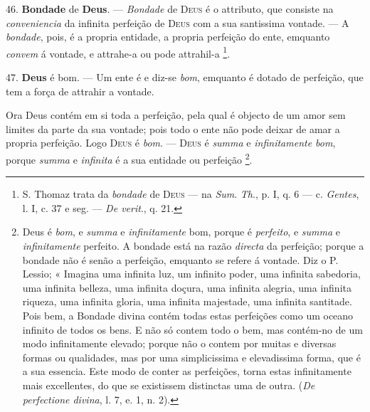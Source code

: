 46. \textbf{Bondade} de \textbf{Deus}. --- \emph{Bondade} de \textsc{Deus} é o attributo, que consiste na \emph{conveniencia} da infinita perfeição de \textsc{Deus} com a sua santissima vontade. --- A \emph{bondade}, pois, é a propria entidade, a propria perfeição do ente, emquanto \emph{convem} á vontade, e attrahe-a ou pode attrahil-a \footnote{S. Thomaz trata da \emph{bondade} de \textsc{Deus} --- na \emph{Sum}. \emph{Th}., p. I, q. 6 --- c. \emph{Gentes}, l. I, c. 37 e seg. --- \emph{De verit}., q. 21.}.

47. \textbf{Deus} é bom. --- Um ente é e diz-se \emph{bom}, emquanto é dotado de perfeição, que tem a força de attrahir a vontade.

 Ora Deus contém em si toda a perfeição, pela qual é objecto de um amor sem limites da parte da sua vontade; pois todo o ente não pode deixar de amar a propria perfeição. Logo \textsc{Deus} é \emph{bom}. --- \textsc{Deus} é \emph{summa} e \emph{infinitamente bom}, porque \emph{summa} e \emph{infinita} é a sua entidade ou perfeição \footnote{Deus é \emph{bom}, e \emph{summa} e \emph{infinitamente} bom, porque é \emph{perfeito}, e \emph{summa} e \emph{infinitamente} perfeito. A bondade está na razão \emph{directa} da perfeição; porque a bondade não é senão a perfeição, emquanto se refere á vontade. Diz o P. Lessio; « Imagina uma infinita luz, um infinito poder, uma infinita sabedoria, uma infinita belleza, uma infinita doçura, uma infinita alegria, uma infinita riqueza, uma infinita gloria, uma infinita majestade, uma infinita santitade. Pois bem, a Bondade divina contém todas estas perfeições como um oceano infinito de todos os bens. E não só contem todo o bem, mas contém-no de um modo infinitamente elevado; porque não o contem por muitas e diversas formas ou qualidades, mas por uma simplicissima e elevadissima forma, que é a sua essencia. Este modo de conter as perfeições, torna estas infinitamente mais excellentes, do que se existissem distinctas uma de outra. (\emph{De perfectione divina}, l. 7, e. 1, n. 2).}.

